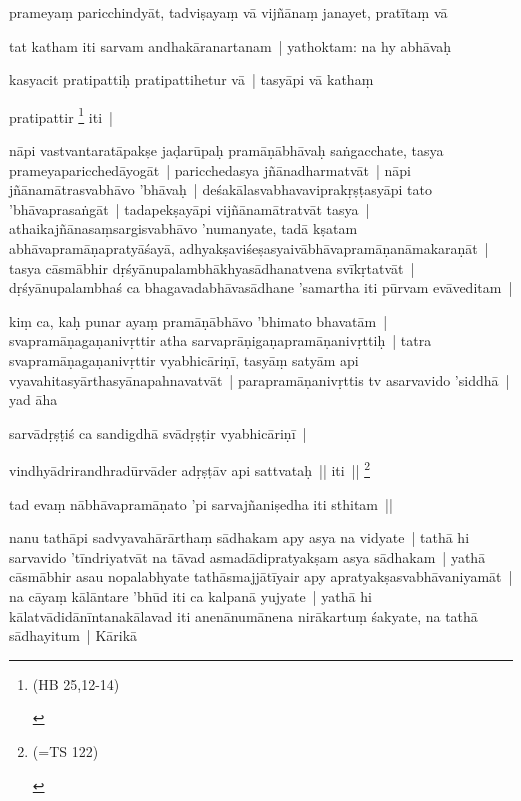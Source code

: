 \documentclass[article,a4paper]{memoir}
\begin{document}
	  \pstart prameyaṃ paricchindyā\-t, tadviṣayaṃ vā\- vijñā\-naṃ janayet, pratī\-taṃ vā\- 
	\pend
      

	  \pstart tat katham iti sarvam andhakā\-ranartanam | yathoktam: na hy abhā\-vaḥ 
	\pend
      

	  \pstart kasyacit pratipattiḥ pratipattihetur vā\- | tasyā\-pi vā\- kathaṃ 
	\pend
      

	  \pstart pratipattir \footnote{\begin{english}(HB 25,12-14)\end{english}} iti |
	\pend
      

	  \pstart nā\-pi vastvantaratā\-pakṣe jaḍarū\-paḥ pramā\-ṇā\-bhā\-vaḥ saṅgacchate, tasya prameyaparicchedā\-yogā\-t | paricchedasya jñā\-nadharmatvā\-t | nā\-pi jñā\-namā\-trasvabhā\-vo 'bhā\-vaḥ | deśakā\-lasvabhavaviprakṛṣṭasyā\-pi tato 'bhā\-vaprasaṅgā\-t | tadapekṣayā\-pi vijñā\-namā\-tratvā\-t tasya | athaikajñā\-nasaṃsargisvabhā\-vo 'numanyate, tadā\- kṣatam abhā\-vapramā\-ṇapratyā\-śayā\-, adhyakṣaviśeṣasyaivā\-bhā\-vapramā\-ṇanā\-makaraṇā\-t | tasya cā\-smā\-bhir dṛśyā\-nupalambhā\-khyasā\-dhanatvena svī\-kṛtatvā\-t | dṛśyā\-nupalambhaś ca bhagavadabhā\-vasā\-dhane 'samartha iti pū\-rvam evā\-veditam | 
	\pend
      

	  \pstart kiṃ ca, kaḥ punar ayaṃ pramā\-ṇā\-bhā\-vo 'bhimato bhavatā\-m | svapramā\-ṇagaṇanivṛttir atha sarvaprā\-ṇigaṇapramā\-ṇanivṛttiḥ | tatra svapramā\-ṇagaṇanivṛttir vyabhicā\-riṇī\-, tasyā\-ṃ satyā\-m api vyavahitasyā\-rthasyā\-napahnavatvā\-t | parapramā\-ṇanivṛttis tv asarvavido 'siddhā\- | yad ā\-ha 
	\pend
      

	  \pstart sarvā\-dṛṣṭiś ca sandigdhā\- svā\-dṛṣṭir vyabhicā\-riṇī\- | 
	\pend
      

	  \pstart vindhyā\-drirandhradū\-rvā\-der adṛṣṭā\-v api sattvataḥ || iti || \footnote{\begin{english}(=TS 122)\end{english}}
	\pend
      

	  \pstart tad evaṃ nā\-bhā\-vapramā\-ṇato 'pi sarvajñaniṣedha iti sthitam || 
	\pend
      

	  \pstart nanu tathā\-pi sadvyavahā\-rā\-rthaṃ sā\-dhakam apy asya na vidyate | tathā\- hi sarvavido 'tī\-ndriyatvā\-t na tā\-vad asmadā\-dipratyakṣam asya sā\-dhakam | yathā\- cā\-smā\-bhir asau nopalabhyate tathā\-smajjā\-tī\-yair apy apratyakṣasvabhā\-vaniyamā\-t | na cā\-yaṃ kā\-lā\-ntare 'bhū\-d iti ca kalpanā\- yujyate | yathā\- hi kā\-latvā\-didā\-nī\-ntanakā\-lavad iti anenā\-numā\-nena nirā\-kartuṃ śakyate, na tathā\- sā\-dhayitum | Kā\-rikā\- 
	\pend
      
\end{document}
